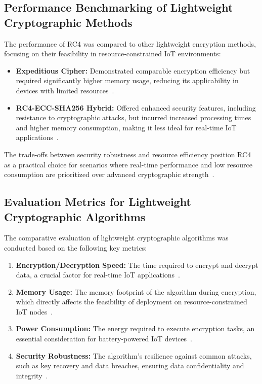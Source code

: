 \documentclass[runningheads]{llncs}
\begin{document}
\subsection{Performance Benchmarking of Lightweight Cryptographic Methods}

The performance of RC4 was compared to other lightweight encryption methods, focusing on their feasibility in resource-constrained IoT environments:
\begin{itemize}
    \item \textbf{Expeditious Cipher:} Demonstrated comparable encryption efficiency but required significantly higher memory usage, reducing its applicability in devices with limited resources~\cite{ref3,ref18,ref8}.
    \item \textbf{RC4-ECC-SHA256 Hybrid:} Offered enhanced security features, including resistance to cryptographic attacks, but incurred increased processing times and higher memory consumption, making it less ideal for real-time IoT applications~\cite{ref5,ref18,ref8}.
\end{itemize}
The trade-offs between security robustness and resource efficiency position RC4 as a practical choice for scenarios where real-time performance and low resource consumption are prioritized over advanced cryptographic strength~\cite{ref4,ref18,ref8}.

\subsection{Evaluation Metrics for Lightweight Cryptographic Algorithms}

The comparative evaluation of lightweight cryptographic algorithms was conducted based on the following key metrics:
\begin{enumerate}
    \item \textbf{Encryption/Decryption Speed:} The time required to encrypt and decrypt data, a crucial factor for real-time IoT applications~\cite{ref10,ref18,ref8}.
    \item \textbf{Memory Usage:} The memory footprint of the algorithm during encryption, which directly affects the feasibility of deployment on resource-constrained IoT nodes~\cite{ref15,ref8}.
    \item \textbf{Power Consumption:} The energy required to execute encryption tasks, an essential consideration for battery-powered IoT devices~\cite{ref2,ref18,ref8}.
    \item \textbf{Security Robustness:} The algorithm's resilience against common attacks, such as key recovery and data breaches, ensuring data confidentiality and integrity~\cite{ref12,ref8}.
\end{enumerate}
\end{document}
